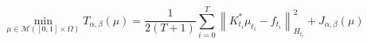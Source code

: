 \documentclass[varwidth=true, border=0pt, convert={size=640x}]{standalone}
\newcommand{\M}{\mathcal{M}}
\newcommand{\norm}[1]{\left\lVert#1\right\rVert}
\begin{document}
\begin{equation*}
        \min_{\mu \in \M([0,1]\times\Omega)} T_{\alpha,\beta}(\mu) = \frac{1}{2(T+1)} 
    \sum_{i=0}^{T}\norm{K_{t_i}^* \mu_{t_i} - f_{t_i}}_{H_{t_i}}^2 
    + J_{\alpha,\beta}(\mu)
\end{equation*}
\end{document}
